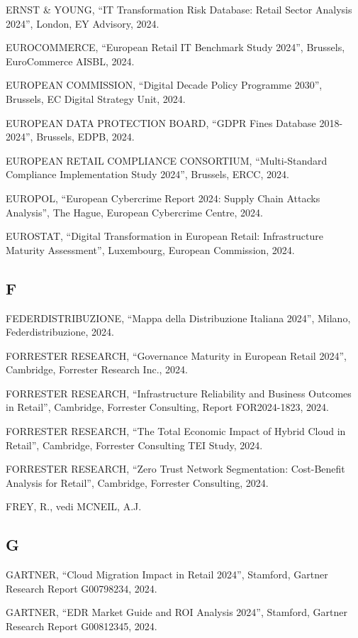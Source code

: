 \documentclass{report}
\begin{document}
ERNST \& YOUNG, ``IT Transformation Risk Database: Retail Sector
Analysis 2024'', London, EY Advisory, 2024.

EUROCOMMERCE, ``European Retail IT Benchmark Study 2024'', Brussels,
EuroCommerce AISBL, 2024.

EUROPEAN COMMISSION, ``Digital Decade Policy Programme 2030'', Brussels,
EC Digital Strategy Unit, 2024.

EUROPEAN DATA PROTECTION BOARD, ``GDPR Fines Database 2018-2024'',
Brussels, EDPB, 2024.

EUROPEAN RETAIL COMPLIANCE CONSORTIUM, ``Multi-Standard Compliance
Implementation Study 2024'', Brussels, ERCC, 2024.

EUROPOL, ``European Cybercrime Report 2024: Supply Chain Attacks
Analysis'', The Hague, European Cybercrime Centre, 2024.

EUROSTAT, ``Digital Transformation in European Retail: Infrastructure
Maturity Assessment'', Luxembourg, European Commission, 2024.

\subsection{F}\label{f-1}

FEDERDISTRIBUZIONE, ``Mappa della Distribuzione Italiana 2024'', Milano,
Federdistribuzione, 2024.

FORRESTER RESEARCH, ``Governance Maturity in European Retail 2024'',
Cambridge, Forrester Research Inc., 2024.

FORRESTER RESEARCH, ``Infrastructure Reliability and Business Outcomes
in Retail'', Cambridge, Forrester Consulting, Report FOR2024-1823, 2024.

FORRESTER RESEARCH, ``The Total Economic Impact of Hybrid Cloud in
Retail'', Cambridge, Forrester Consulting TEI Study, 2024.

FORRESTER RESEARCH, ``Zero Trust Network Segmentation: Cost-Benefit
Analysis for Retail'', Cambridge, Forrester Consulting, 2024.

FREY, R., vedi MCNEIL, A.J.

\subsection{G}\label{g-1}

GARTNER, ``Cloud Migration Impact in Retail 2024'', Stamford, Gartner
Research Report G00798234, 2024.

GARTNER, ``EDR Market Guide and ROI Analysis 2024'', Stamford, Gartner
Research Report G00812345, 2024.
\end{document}
